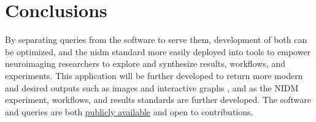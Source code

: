 \documentclass[twocolumn]{bmcart}%
\begin{document}
\section{Conclusions}\label{conclusions}

By separating queries from the software to serve them, development of both can be optimized, and the nidm standard more easily deployed into tools to empower neuroimaging researchers to explore and synthesize results, workflows, and experiments. This application will be further developed to return more modern and desired outputs such as images and interactive graphs \cite{noauthor_undated-fs}, and as the NIDM experiment, workflows, and results standards are further developed. The software and queries are both \href{https://github.com/incf-nidash}{publicly available} and open to contributions.

\end{document}
